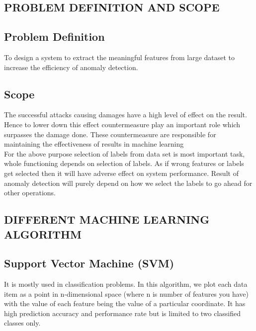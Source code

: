 \documentclass[a4paper, 12pt]{article}
\begin{document}
\newpage
\begin{center}
\section{PROBLEM DEFINITION AND SCOPE}
\end{center}

\subsection{Problem Definition}

\hspace{1.5cm} To design a system to extract the meaningful features from large dataset to increase the efficiency of anomaly detection.

\subsection{Scope}

\hspace{1.5cm} The successful attacks causing damages have a high level of effect on the result. Hence to lower down this effect countermeasure play an important role which surpasses the damage done. These countermeasure are responsible for maintaining the effectiveness of results in machine learning \\

\hspace{1.5cm} For the above purpose selection of labels from data set is most important task, whole functioning depends on selection of labels. As if wrong features or labels get selected then it will have adverse effect on system performance.
\hspace{1.5cm} Result of anomaly detection will purely depend on how we select the labels to go ahead for other operations.
\newpage
\begin{center}
\section{DIFFERENT MACHINE LEARNING ALGORITHM}
\end{center}
\subsection{Support Vector Machine (SVM)}
\par
\hspace{1cm}
It is mostly used in classification problems. In this algorithm, we plot each data item as a point in n-dimensional space (where n is number of features you have) with the value of each feature being the value of a particular coordinate. It has high prediction
accuracy and performance rate but is limited to two classified classes only.
\end{document}
